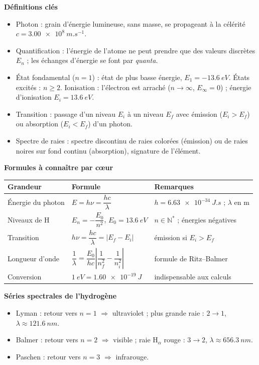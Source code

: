 \documentclass[11pt]{article}
\newcommand{\cle}[1]{{\popxbold\color{popdark}#1}}
\begin{document}
\begin{bilan}
\textbf{Définitions clés}
\begin{itemize}
  \item \cle{Photon} : grain d'énergie lumineuse, sans masse, se propageant à la célérité $c=\SI{3,00e8}{m.s^{-1}}$.
  \item \cle{Quantification} : l'énergie de l'atome ne peut prendre que des valeurs discrètes $E_n$ ; les échanges d'énergie se font par \emph{quanta}.
  \item \cle{État fondamental} ($n=1$) : état de plus basse énergie, $E_1=-\SI{13,6}{eV}$. \cle{États excités} : $n\geq 2$. \cle{Ionisation} : l'électron est arraché ($n\to\infty$, $E_\infty=0$) ; énergie d'ionisation $E_i=\SI{13,6}{eV}$.
  \item \cle{Transition} : passage d'un niveau $E_i$ à un niveau $E_f$ avec émission ($E_i>E_f$) ou absorption ($E_i<E_f$) d'un photon.
  \item \cle{Spectre de raies} : spectre discontinu de raies colorées (émission) ou de raies noires sur fond continu (absorption), signature de l'élément.
\end{itemize}

\textbf{Formules à connaître par cœur}
\begin{center}
\begin{tabularx}{\linewidth}{|l|X|X|}\hline
\rowcolor{popblueL} \textbf{Grandeur} & \textbf{Formule} & \textbf{Remarques} \\ \hline
Énergie du photon & $E=h\nu=\dfrac{hc}{\lambda}$ & $h=\SI{6,63e-34}{J.s}$ ; $\lambda$ en m \\ \hline
Niveaux de H & $E_n=-\dfrac{E_0}{n^2}$, $E_0=\SI{13,6}{eV}$ & $n\in\mathbb{N}^*$ ; énergies négatives \\ \hline
Transition & $h\nu=\dfrac{hc}{\lambda}=|E_f-E_i|$ & émission si $E_i>E_f$ \\ \hline
Longueur d'onde & $\dfrac{1}{\lambda}=\dfrac{E_0}{hc}\left|\dfrac{1}{n_f^2}-\dfrac{1}{n_i^2}\right|$ & formule de Ritz--Balmer \\ \hline
Conversion & $\SI{1}{eV}=\SI{1,60e-19}{J}$ & indispensable aux calculs \\ \hline
\end{tabularx}
\end{center}

\textbf{Séries spectrales de l'hydrogène}
\begin{itemize}
  \item \cle{Lyman} : retour vers $n=1$ $\Rightarrow$ ultraviolet ; plus grande raie : $2\to1$, $\lambda\approx\SI{121,6}{nm}$.
  \item \cle{Balmer} : retour vers $n=2$ $\Rightarrow$ visible ; raie H$_\alpha$ rouge : $3\to2$, $\lambda\approx\SI{656,3}{nm}$.
  \item \cle{Paschen} : retour vers $n=3$ $\Rightarrow$ infrarouge.
\end{itemize}


\end{bilan}
\end{document}
